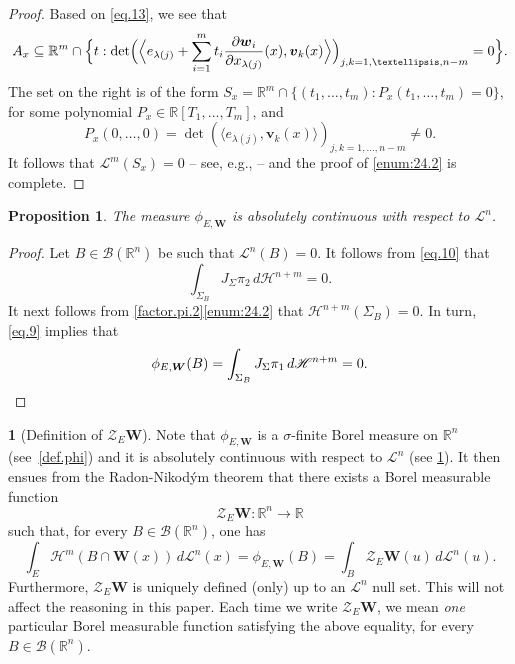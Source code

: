 \documentclass[11pt]{article}
\newcounter{cdrthm}[section]
\newtheorem{Proposition}[cdrthm]{Proposition}
\theoremstyle{definition}
\theoremstyle{jepanonymous}
\newtheorem{jepempty}[cdrthm]{}
\newenvironment{enonce}[2][remark]{\begin{jepempty}[#2]}{\end{jepempty}}
\theoremstyle{plain}
\newenvironment{Empty}[2][\null]{%
\begin{enonce}[remark]{#1}#2}
{\end{enonce}}
\newcommand{\R}{\mathbb{R}}
\newcommand{\Rm}{\R^m}
\newcommand{\Rn}{\R^n}
\newcommand{\calB}{\mathscr{B}}
\newcommand{\calH}{\mathscr{H}}
\newcommand{\calL}{\mathscr{L}}
\newcommand{\calZ}{\mathscr{Z}}
\newcommand{\bW}{{\boldsymbol{W}}}
\newcommand{\bv}{{\boldsymbol{v}}}
\newcommand{\bw}{{\boldsymbol{w}}}
\let\la\langle
\let\ra\rangle
\let\subset\subseteq
\begin{document}
\begin{proof}
Based on \eqref{eq.13}, we see that
\begin{equation*}
A_x \subset \Rm \cap \Bigl\{ t: \det \Bigl(\Bigl\la e_{\lambda(j)} + \sum_{i=1}^m t_i \dfrac{\partial \bw_i}{\partial x_{\lambda(j)}}(x), \bv_k(x) \Bigr\ra\Bigr)_{j,k=1,\ldots,n-m}=0\Bigr\}.
\end{equation*}
The set on the right is of the form $S_x = \Rm \cap \{ (t_1,\ldots,t_m): P_x(t_1,\ldots,t_m) = 0 \}$, for some polynomial $P_x \in \R[T_1,\ldots,T_m]$, and
\[
P_x(0,\ldots,0) = \det\left(\la e_{\lambda(j)},\bv_k(x) \ra\right)_{j,k=1,\ldots,n-m} \neq 0.
\]
It follows that $\calL^m(S_x)=0$ -- see, e.g., \cite[2.6.5]{GMT} -- and the proof of \eqref{enum:24.2} is complete.
\end{proof}

\begin{Proposition}
\label{AC.1}
The measure $\phi_{E,\bW}$ is absolutely continuous with respect to $\calL^n$.
\end{Proposition}

\begin{proof}
Let $B \in \calB(\Rn)$ be such that $\calL^n(B)=0$.
It follows from \eqref{eq.10} that
\begin{equation*}
\int_{\Sigma_B} J_\Sigma \pi_2 \,d\calH^{n+m} = 0.
\end{equation*}
It next follows from \ref{factor.pi.2}\eqref{enum:24.2} that $\calH^{n+m}(\Sigma_B)=0$.
In turn, \eqref{eq.9} implies that
\begin{equation*}
\phi_{E,\bW}(B) = \int_{\Sigma_B} J_\Sigma \pi_1 \,d\calH^{n+m} = 0.\qedhere
\end{equation*}
\end{proof}

\begin{Empty}[Definition of $\calZ_E \bW$]
\label{def.Z}
Note that $\phi_{E,\bW}$ is a $\sigma$-finite Borel measure on $\Rn$ (see~\ref{def.phi}) and it is absolutely continuous with respect to $\calL^n$ (see \ref{AC.1}).
It then ensues from the Radon-Nikod\'ym theorem that there exists a Borel measurable function
\begin{equation*}
\calZ_E \bW: \Rn \to \R
\end{equation*}
such that, for every $B \in \calB(\Rn)$, one has
\begin{equation*}
\int_E \calH^m(B \cap \bW(x)) \,d\calL^n(x) = \phi_{E,\bW}(B) = \int_B \calZ_E \bW(u) \,d\calL^n(u).
\end{equation*}
Furthermore, $\calZ_E \bW$ is uniquely defined (only) up to an $\calL^n$ null set.
This will not affect the reasoning in this paper.
Each time we write $\calZ_E \bW$, we mean \emph{one} particular Borel measurable function satisfying the above equality, for every $B \in \calB(\Rn)$.
\end{Empty}
\end{document}
